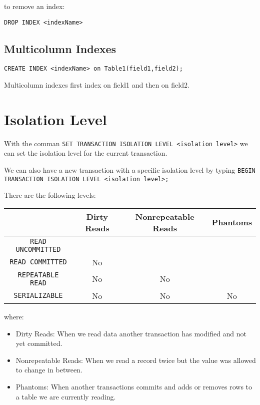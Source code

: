 \documentclass{sciposter}
\renewcommand{\t}[1]{\texttt{#1}}
\begin{document}
\begin{multicols}{3}
to remove an index:

\t{DROP INDEX <indexName>}

\subsection*{Multicolumn Indexes}

\t{CREATE INDEX <indexName> on Table1(field1,field2);}

Multicolumn indexes first index on field1 and then on field2.





\section*{Isolation Level}

With the comman \texttt{SET TRANSACTION ISOLATION LEVEL <isolation level>} we can set the isolation level for the current transaction.

We can also have a new transaction with a specific isolation level by typing \texttt{BEGIN TRANSACTION ISOLATION LEVEL <isolation level>;}




There are the following levels:

\begin{tabular}{|c|c|c|c|}
	\hline
	& Dirty Reads & Nonrepeatable Reads & Phantoms \\
	\hline
	\texttt{READ UNCOMMITTED}&  &  &  \\
	\hline
	\texttt{READ COMMITTED}& No &  &  \\
	\hline
	\texttt{REPEATABLE READ}& No & No &  \\
	\hline
	\texttt{SERIALIZABLE}& No & No & No \\
	\hline
\end{tabular}


where:

\begin{itemize}
	\item Dirty Reads: When we read data another transaction has modified and not yet committed.
	\item Nonrepeatable Reads: When we read a record twice but the value was allowed to change in between.
	\item Phantoms: When another transactions commits and adds or removes rows to a table we are currently reading. 
\end{itemize}

\vfill\null 
\columnbreak



\end{multicols}
\end{document}
